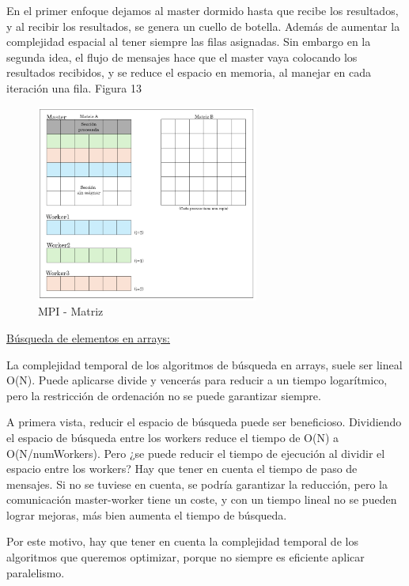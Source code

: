 En el primer enfoque dejamos al master dormido hasta que recibe los resultados, y al recibir los resultados, se genera un cuello de botella. Además de aumentar la complejidad espacial al tener siempre las filas asignadas. Sin embargo en la segunda idea, el flujo de mensajes hace que el master vaya colocando los resultados recibidos, y se reduce el espacio en memoria, al manejar en cada iteración una fila. Figura 13

\begin{figure}[!h]
	\centering
	\includegraphics[width=0.65\textwidth]{images/chapter_3/matriz_mpi}
	\caption{MPI - Matriz}
	\label{fig:matrizmpi}
\end{figure}

\begin{flushleft}
	\underline{Búsqueda de elementos en arrays: }
\end{flushleft}
La complejidad temporal de los algoritmos de búsqueda en arrays, suele ser lineal O(N). Puede aplicarse divide y vencerás para reducir a un tiempo logarítmico, pero la restricción de ordenación no se puede garantizar siempre.

A primera vista, reducir el espacio de búsqueda puede ser beneficioso. Dividiendo el espacio de búsqueda entre los workers reduce el tiempo de O(N) a O(N/numWorkers). Pero ¿se puede reducir el tiempo de ejecución al dividir el espacio entre los workers? Hay que tener en cuenta el tiempo de paso de mensajes. Si no se tuviese en cuenta, se podría garantizar la reducción, pero la comunicación master-worker tiene un coste, y con un tiempo lineal no se pueden lograr mejoras, más bien aumenta el tiempo de búsqueda.

Por este motivo, hay que tener en cuenta la complejidad temporal de los algoritmos que queremos optimizar, porque no siempre es eficiente aplicar paralelismo.


